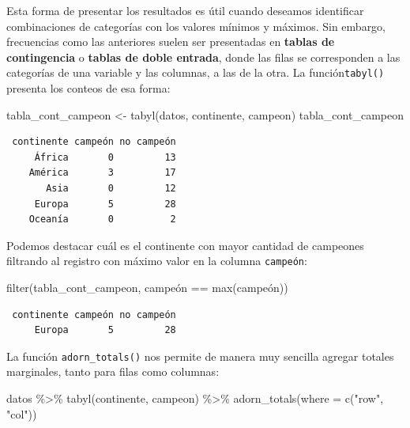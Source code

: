 \documentclass[
]{book}
\newenvironment{Shaded}{\begin{snugshade}}{\end{snugshade}}
\newcommand{\AttributeTok}[1]{\textcolor[rgb]{0.77,0.63,0.00}{#1}}
\newcommand{\FunctionTok}[1]{\textcolor[rgb]{0.00,0.00,0.00}{#1}}
\newcommand{\NormalTok}[1]{#1}
\newcommand{\OtherTok}[1]{\textcolor[rgb]{0.56,0.35,0.01}{#1}}
\newcommand{\SpecialCharTok}[1]{\textcolor[rgb]{0.00,0.00,0.00}{#1}}
\newcommand{\StringTok}[1]{\textcolor[rgb]{0.31,0.60,0.02}{#1}}
\begin{document}
Esta forma de presentar los resultados es útil cuando deseamos identificar combinaciones de categorías con los valores mínimos y máximos. Sin embargo, frecuencias como las anteriores suelen ser presentadas en \textbf{tablas de contingencia} o \textbf{tablas de doble entrada}, donde las filas se corresponden a las categorías de una variable y las columnas, a las de la otra. La función\texttt{tabyl()} presenta los conteos de esa forma:

\begin{Shaded}
\begin{Highlighting}[]
\NormalTok{tabla\_cont\_campeon }\OtherTok{\textless{}{-}} \FunctionTok{tabyl}\NormalTok{(datos, continente, campeon)}
\NormalTok{tabla\_cont\_campeon}
\end{Highlighting}
\end{Shaded}

\begin{verbatim}
 continente campeón no campeón
     África       0         13
    América       3         17
       Asia       0         12
     Europa       5         28
    Oceanía       0          2
\end{verbatim}

Podemos destacar cuál es el continente con mayor cantidad de campeones filtrando al registro con máximo valor en la columna \texttt{campeón}:

\begin{Shaded}
\begin{Highlighting}[]
\FunctionTok{filter}\NormalTok{(tabla\_cont\_campeon, campeón }\SpecialCharTok{==} \FunctionTok{max}\NormalTok{(campeón))}
\end{Highlighting}
\end{Shaded}

\begin{verbatim}
 continente campeón no campeón
     Europa       5         28
\end{verbatim}

La función \texttt{adorn\_totals()} nos permite de manera muy sencilla agregar totales marginales, tanto para filas como columnas:

\begin{Shaded}
\begin{Highlighting}[]
\NormalTok{datos }\SpecialCharTok{\%\textgreater{}\%} 
  \FunctionTok{tabyl}\NormalTok{(continente, campeon) }\SpecialCharTok{\%\textgreater{}\%} 
  \FunctionTok{adorn\_totals}\NormalTok{(}\AttributeTok{where =} \FunctionTok{c}\NormalTok{(}\StringTok{"row"}\NormalTok{, }\StringTok{"col"}\NormalTok{))}
\end{Highlighting}
\end{Shaded}
\end{document}
